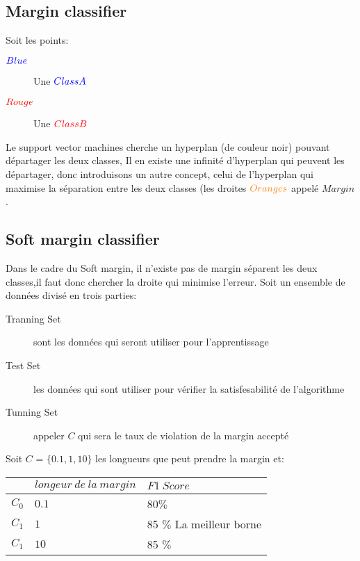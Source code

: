 \subsection{Margin classifier}
Soit les points:
\begin{description}
\item[$\textcolor{blue}{Blue}$] Une $\textcolor{blue}{ClassA}$
\item[$\textcolor{red}{Rouge}$] Une $\textcolor{red}{ClassB}$
\end{description}
Le support vector machines cherche un hyperplan (de couleur noir) pouvant départager les deux classes,
Il en existe une infinité d'hyperplan qui peuvent les départager, donc introduisons un autre concept, celui de 
l'hyperplan qui maximise la séparation entre les deux classes (les droites $\textcolor{orange}{Oranges}$ appelé $Margin$.\\



\subsection{Soft margin classifier}
Dans le cadre du Soft margin, il n'existe pas de margin séparent les deux classes,il faut donc chercher la droite qui minimise l'erreur.
Soit un ensemble de données divisé en trois parties:
\begin{description}
\item[Tranning Set] sont les données qui seront utiliser pour l'apprentissage
\item[Test Set] les données qui sont utiliser pour vérifier la satisfesabilité de l'algorithme 
\item[Tunning Set] appeler $C$ qui sera le taux de violation de la margin accepté
\end{description}

Soit $C$ = $\{ 0.1, 1, 10\}$ les longueurs que peut prendre la margin et:\\
\begin{center}

\begin{tabular}{l|ll}
\hline
$ $ & $longeur\ de\ la\ margin$ & $F1\ Score$\\
\hline
$C_0$ & $0.1$ & 80$\%$ \\
$C_1$ & $1$ & 85 $\%$ La meilleur borne\\
$C_1$ & $10$ & 85 $\%$\\
\hline
\end{tabular}
\end{center}

